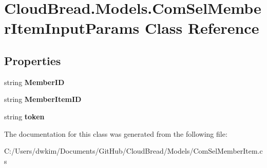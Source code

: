 \hypertarget{a00063}{}\section{Cloud\+Bread.\+Models.\+Com\+Sel\+Member\+Item\+Input\+Params Class Reference}
\label{a00063}
\subsection*{Properties}
\begin{DoxyCompactItemize}
\item 
string {\bfseries Member\+ID}\hypertarget{a00063_a1f300e2b40f67d8c99320ba76af851d3}{}\label{a00063_a1f300e2b40f67d8c99320ba76af851d3}

\item 
string {\bfseries Member\+Item\+ID}\hypertarget{a00063_a5493617ccd4b877dd0ca62afe68794d5}{}\label{a00063_a5493617ccd4b877dd0ca62afe68794d5}

\item 
string {\bfseries token}\hypertarget{a00063_a9b12b3717e52a605640a0a289d5dbccf}{}\label{a00063_a9b12b3717e52a605640a0a289d5dbccf}

\end{DoxyCompactItemize}


The documentation for this class was generated from the following file\+:\begin{DoxyCompactItemize}
\item 
C\+:/\+Users/dwkim/\+Documents/\+Git\+Hub/\+Cloud\+Bread/\+Models/Com\+Sel\+Member\+Item.\+cs\end{DoxyCompactItemize}
